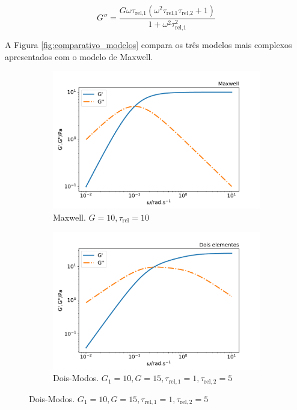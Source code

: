 			\begin{equation}
				G'' = \dfrac{G \omega \tau_{\textrm{rel,1}} \left(\omega^{2} \tau_{\textrm{rel,1}} \tau_{\textrm{rel,2}} + 1\right)}{1 + \omega^{2} \tau_{\textrm{rel,1}}^{2}}
				\label{eqn:modelo_jeffreys_g2}
			\end{equation}
			
			
			A Figura \ref{fig:comparativo_modelos} compara os três modelos mais complexos apresentados com o modelo de Maxwell. 
			
			\begin{figure}[H]
				\begin{subfigure}[t]{.5\textwidth}
					\centering
					\includegraphics[width=\textwidth]{./imagens/reologia/modelos_comparativo_max}
					\caption{Maxwell. \(G=10, \tau_{\mathrm{rel}}=10\)}
					\label{fig:comparativo_modelo_maxwell}
				\end{subfigure}%
				\begin{subfigure}[t]{.5\textwidth}
					\centering
					\includegraphics[width=\textwidth]{./imagens/reologia/modelos_comparativo_doismodos}
					\caption{Dois-Modos. \(G_1=10, G=15, \tau_{\mathrm{rel,1}}=1,  \tau_{\mathrm{rel,2}}=5\)}
					\label{fig:comparativo_modelo_doismodos}
				\end{subfigure}
			

\end{figure}
